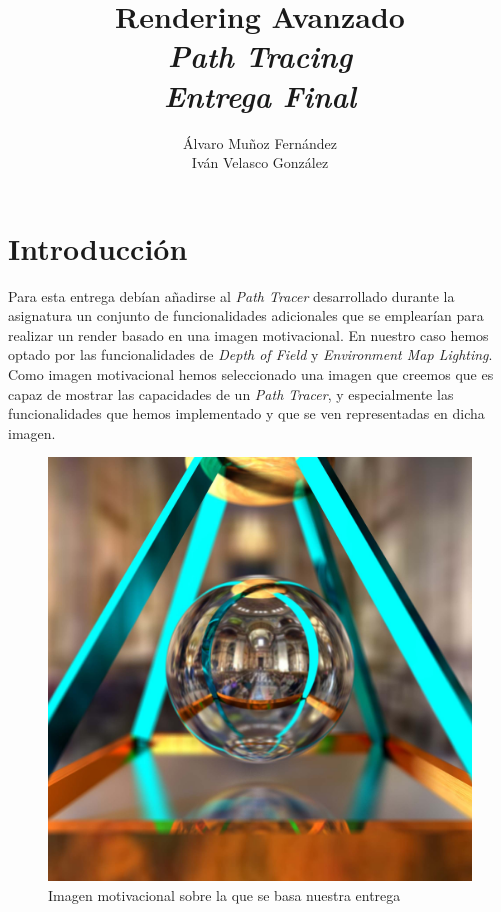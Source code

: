 \documentclass[10pt,oneside,a4paper]{article}
\begin{document}
\begin{titlepage}

\title{\Huge Rendering Avanzado  \\[0.7in] \LARGE \textit{Path Tracing\\Entrega Final}\\[3.6in]}
\date{}
\author{Álvaro Muñoz Fernández\\
Iván Velasco González}
\maketitle
\thispagestyle{empty}
\end{titlepage}

\section{Introducción}
Para esta entrega debían añadirse al \emph{Path Tracer} desarrollado durante la asignatura un conjunto de funcionalidades adicionales que se emplearían para realizar un render basado en una imagen motivacional. En nuestro caso hemos optado por las funcionalidades de \emph{Depth of Field} y \emph{Environment Map Lighting}. Como imagen motivacional hemos seleccionado una imagen que creemos que es capaz de mostrar las capacidades de un \emph{Path Tracer}, y especialmente las funcionalidades que hemos implementado y que se ven representadas en dicha imagen.

\begin{figure}[h]
\centering
\includegraphics[width=1\linewidth]{images/motivacional.jpg}
\caption{Imagen motivacional sobre la que se basa nuestra entrega}
\label{fig:disp}
\end{figure}
\newpage
\end{document}
